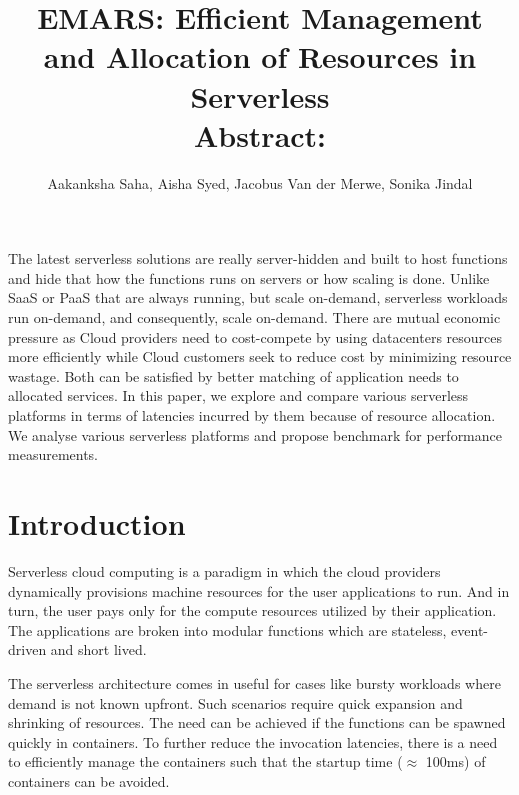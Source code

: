 \documentclass[letterpaper,twocolumn,10pt]{article}
\title{EMARS: Efficient Management and Allocation of Resources in Serverless\\}
\author{Aakanksha Saha, Aisha Syed, Jacobus Van der Merwe, Sonika Jindal}
\date{}
\affil{University of Utah}
\begin{document}
\maketitle
\title{\textbf{Abstract:}} The latest serverless
solutions are really server-hidden and built to host functions 
and hide that how the functions runs on servers or how scaling is 
done. Unlike SaaS or PaaS that are always running, but scale 
on-demand, serverless workloads run on-demand, and consequently, 
scale on-demand. There are mutual economic pressure as Cloud 
providers need to cost-compete by using datacenters resources more 
efficiently while Cloud customers seek to reduce cost by minimizing resource wastage. Both can be satisfied by better matching of application needs to allocated services. 
In this paper, we explore and compare various serverless platforms in terms of latencies incurred by them because of resource allocation. We analyse various serverless platforms and propose benchmark for performance measurements. 

\section{Introduction}
\label{sec:first}
Serverless cloud computing is a paradigm in which the cloud providers dynamically provisions machine resources for the user applications to run. And in turn, the user pays only for the compute resources utilized by their application. The applications are broken into modular functions which are stateless, event-driven and short lived.

The serverless architecture comes in useful for cases like bursty workloads where demand is not known upfront. Such scenarios require quick expansion and shrinking of resources. The need can be achieved if the functions can be spawned quickly in containers. To further reduce the invocation latencies, there is a need to efficiently manage the containers such that the startup time ($\approx$ 100ms) of containers can be avoided.
\end{document}
